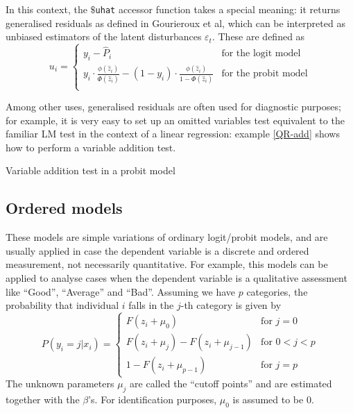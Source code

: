 In this context, the \texttt{$\$$uhat} accessor function
takes a special meaning: it returns generalised residuals as defined
in Gourieroux et al, which can be interpreted as unbiased estimators
of the latent disturbances $\varepsilon_t$. These are defined as
\begin{equation}
  \label{eq:QR-genres}
  u_i = \left\{
    \begin{array}{ll}
      y_i - \hat{P}_i & \textrm{for the logit model} \\
      y_i\cdot \frac{\phi(\hat{z}_i)}{\Phi(\hat{z}_i)} - 
      ( 1 - y_i ) \cdot \frac{\phi(\hat{z}_i)}{1 - \Phi(\hat{z}_i)}
      & \textrm{for the probit model} \\
    \end{array}
    \right.
\end{equation}

Among other uses, generalised residuals are often used for diagnostic
purposes; for example, it is very easy to set up an omitted variables
test equivalent to the familiar LM test in the context of a linear
regression: example \ref{QR-add} shows how to perform a variable
addition test.

\begin{script}[htbp]
  \caption{Variable addition test in a probit model}
  \label{QR-add}
\end{script}

\subsection{Ordered models}
\label{sec:ordered}

These models are simple variations of ordinary logit/probit models,
and are usually applied in case the dependent variable is a
discrete and ordered measurement, not necessarily quantitative. For
example, this models can be applied to analyse cases when the
dependent variable is a qualitative assessment like ``Good'',
``Average'' and ``Bad''. Assuming we have $p$ categories, the
probability that individual $i$ falls in the $j$-th category is given
by
\begin{equation}
  \label{eq:QR-ordered}
  P(y_i = j | x_i) = \left\{
    \begin{array}{ll}
      F(z_i + \mu_0) & \textrm{for } j = 0 \\
      F(z_i + \mu_j) -  F(z_i + \mu_{j-1}) & \textrm{for } 0 < j < p \\
      1 -  F(z_i + \mu_{p-1}) & \textrm{for } j = p 
    \end{array}
    \right.
\end{equation}
The unknown parameters $\mu_j$ are called the ``cutoff
points'' and are estimated together with the $\beta$'s. For
identification purposes, $\mu_0$ is assumed to be 0.

